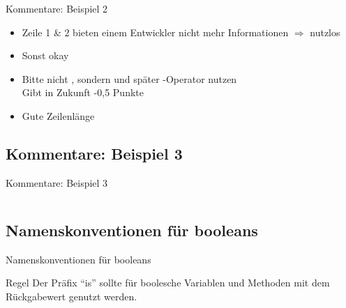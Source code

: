 \documentclass[usepdftitle=false,hyperref={pdfpagelabels=false}]{beamer}
\begin{document}
\begin{frame}{Kommentare: Beispiel 2}
    \begin{itemize}
        \item Zeile 1 \& 2 bieten einem Entwickler nicht mehr Informationen 
              $\Rightarrow$ nutzlos
        \item Sonst okay
        \item Bitte nicht , sondern 
              und später -Operator nutzen\\
              Gibt in Zukunft -0,5 Punkte
        \item Gute Zeilenlänge \smiley
    \end{itemize}
\end{frame}

\subsection{Kommentare: Beispiel 3}
\begin{frame}{Kommentare: Beispiel 3}
    \inputminted[linenos=true, numbersep=5pt, tabsize=4, fontsize=\tiny]{java}{Kommentare-3.java}
\end{frame}

\subsection{Namenskonventionen für booleans}
\begin{frame}{Namenskonventionen für booleans}
    \begin{block}{Regel}
        Der Präfix "`is"' sollte für boolesche Variablen und Methoden
        mit dem Rückgabewert  genutzt werden.
    \end{block}



\end{frame}
\end{document}
